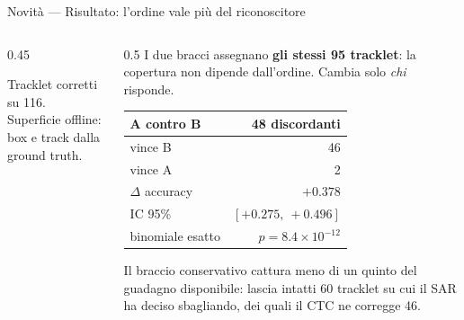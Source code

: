 \documentclass[aspectratio=169,10pt]{beamer}
\newcommand{\vbar}[4]{%
  \filldraw[fill=#3, draw=black!45, line width=0.3pt]
    (#1-0.30,0) rectangle (#1+0.30,#2);
  \node[font=\tiny, above=0.5pt] at (#1,#2) {#4};}
\newcommand{\xlab}[2]{\node[font=\scriptsize, below=2pt, align=center] at (#1,0) {#2};}
\newcommand{\gline}[3]{%
  \draw[gray!30, line width=0.3pt] (#1,#3) -- (#2,#3);}
\begin{document}
\begin{frame}{Novità --- Risultato: l'ordine vale più del riconoscitore}
  \begin{columns}[T]
    \begin{column}{0.45\textwidth}
      \centering
      \vspace{1.3em}

      \footnotesize
      Tracklet corretti su 116.\\
      Superficie offline: box e track dalla ground truth.
    \end{column}
    \begin{column}{0.5\textwidth}
      \small
      I due bracci assegnano \textbf{gli stessi 95 tracklet}: la copertura non
      dipende dall'ordine. Cambia solo \emph{chi} risponde.
      \vspace{0.4em}
      \begin{center}\footnotesize
      \begin{tabular}{lr}
        \toprule
        A contro B & 48 discordanti \\
        \midrule
        vince B & 46 \\
        vince A & 2 \\
        \midrule
        $\Delta$ accuracy & $+0.378$ \\
        IC 95\% & $[+0.275,\ +0.496]$ \\
        binomiale esatto & $p = 8.4\times10^{-12}$ \\
        \bottomrule
      \end{tabular}
      \end{center}
      \vspace{0.4em}
      Il braccio conservativo cattura meno di un quinto del guadagno
      disponibile: lascia intatti 60 tracklet su cui il SAR ha deciso
      sbagliando, dei quali il CTC ne corregge 46.
    \end{column}
  \end{columns}
\end{frame}
\end{document}
